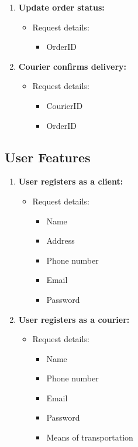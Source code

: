 \documentclass[a4paper,twoside,11pt]{article}
\begin{document}
\begin{enumerate}
    \item \textbf{Update order status:}
    \begin{itemize}
        \item Request details:
        \begin{itemize}
            \item OrderID
        \end{itemize}
    \end{itemize}

    \item \textbf{Courier confirms delivery:}
    \begin{itemize}
        \item Request details:
        \begin{itemize}
            \item CourierID
            \item OrderID
        \end{itemize}
    \end{itemize}
\end{enumerate}

\subsection{User Features}

\begin{enumerate}
    \item \textbf{User registers as a client:}
    \begin{itemize}
        \item Request details:
        \begin{itemize}
            \item Name
            \item Address
            \item Phone number
            \item Email
            \item Password
        \end{itemize}
    \end{itemize}

    \item \textbf{User registers as a courier:}
    \begin{itemize}
        \item Request details:
        \begin{itemize}
            \item Name
            \item Phone number
            \item Email
            \item Password
            \item Means of transportation
        \end{itemize}
    \end{itemize}
\end{enumerate}
\end{document}

